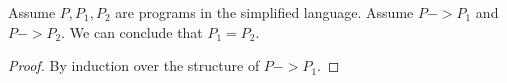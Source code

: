 \begin{mathpar}
\end{mathpar}

\begin{lemma}[Determinism]
  \label{thm:determinism-simple}
  Assume $P, P_1, P_2$ are programs in the simplified language. Assume
  $P -> P_1$ and $P -> P_2$. We can conclude that $P_1 = P_2$.
\end{lemma}
\begin{proof}
  By induction over the structure of $P -> P_1$.
\end{proof}
